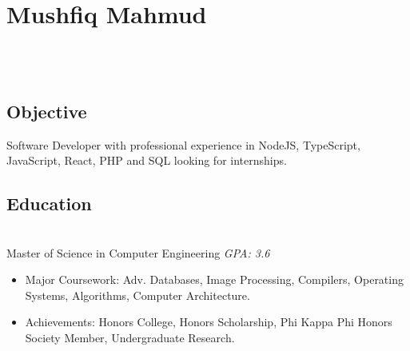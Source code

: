 \documentclass[2pt]{resume}
\begin{document}
\section{Mushfiq Mahmud}

\begin{center}
\address{Tampa, FL}
 \\

 \\
\end{center}


\subsection{Objective}
\small Software Developer with professional experience in NodeJS, TypeScript, JavaScript, React, PHP and SQL looking for internships.


\subsection{Education}
 \\
Master of Science in Computer Engineering \hfill \emph{GPA: 3.6}

\begin{itemize}
\item \small Major Coursework: Adv. Databases, Image Processing, Compilers, Operating Systems, Algorithms, Computer Architecture.
\item \small Achievements: Honors College, Honors Scholarship, Phi Kappa Phi Honors Society Member, Undergraduate Research.
\end{itemize}

\end{document}
